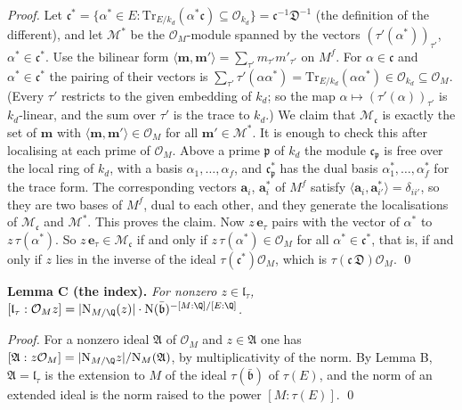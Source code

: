 \documentclass[11pt,letterpaper]{article}
\begin{document}
\emph{Proof.} Let
$\mathfrak c^{*}=\{\alpha^{*}\in E:\mathrm{Tr}_{E/k_d}(\alpha^{*}\mathfrak c)\subseteq\mathcal O_{k_d}\}
=\mathfrak c^{-1}\mathfrak D^{-1}$ (the definition of the different), and let $\mathcal M^{*}$ be the
$\mathcal O_M$-module spanned by the vectors $(\tau'(\alpha^{*}))_{\tau'}$,
$\alpha^{*}\in\mathfrak c^{*}$. Use the bilinear form
$\langle\mathbf m,\mathbf m'\rangle=\sum_{\tau'}m_{\tau'}m'_{\tau'}$ on $M^f$. For $\alpha\in\mathfrak c$
and $\alpha^{*}\in\mathfrak c^{*}$ the pairing of their vectors is
$\sum_{\tau'}\tau'(\alpha\alpha^{*})=\mathrm{Tr}_{E/k_d}(\alpha\alpha^{*})\in\mathcal O_{k_d}\subseteq\mathcal O_M$.
(Every $\tau'$ restricts to the given embedding of $k_d$; so the map
$\alpha\mapsto(\tau'(\alpha))_{\tau'}$ is $k_d$-linear, and the sum over $\tau'$ is the trace to $k_d$.)
We claim that $\mathcal M_{\mathfrak c}$ is exactly the set of $\mathbf m$ with
$\langle\mathbf m,\mathbf m'\rangle\in\mathcal O_M$ for all $\mathbf m'\in\mathcal M^{*}$. It is enough
to check this after localising at each prime of $\mathcal O_M$. Above a prime $\mathfrak p$ of $k_d$ the
module $\mathfrak c_{\mathfrak p}$ is free over the local ring of $k_d$, with a basis
$\alpha_1,\dots,\alpha_f$, and $\mathfrak c^{*}_{\mathfrak p}$ has the dual basis
$\alpha_1^{*},\dots,\alpha_f^{*}$ for the trace form. The corresponding vectors $\mathbf a_i$,
$\mathbf a_i^{*}$ of $M^f$ satisfy $\langle\mathbf a_i,\mathbf a_{i'}^{*}\rangle=\delta_{ii'}$, so they
are two bases of $M^f$, dual to each other, and they generate the localisations of
$\mathcal M_{\mathfrak c}$ and $\mathcal M^{*}$. This proves the claim. Now $z\,\mathbf e_\tau$ pairs with
the vector of $\alpha^{*}$ to $z\,\tau(\alpha^{*})$. So $z\,\mathbf e_\tau\in\mathcal M_{\mathfrak c}$ if
and only if $z\,\tau(\alpha^{*})\in\mathcal O_M$ for all $\alpha^{*}\in\mathfrak c^{*}$, that is, if and
only if $z$ lies in the inverse of the ideal $\tau(\mathfrak c^{*})\mathcal O_M$, which is
$\tau(\mathfrak c\,\mathfrak D)\mathcal O_M$. \qed

\textbf{Lemma C (the index).} \emph{For nonzero $z\in\mathfrak l_\tau$,\quad
$[\mathfrak l_\tau:\mathcal O_Mz]=|\mathrm N_{M/\Q}(z)|\cdot\mathrm N(\bar{\mathfrak b})^{-[M:\Q]/[E:\Q]}$.}

\emph{Proof.} For a nonzero ideal $\mathfrak A$ of $\mathcal O_M$ and $z\in\mathfrak A$ one has
$[\mathfrak A:z\mathcal O_M]=|\mathrm N_{M/\Q}z|/\mathrm N_M(\mathfrak A)$, by multiplicativity of the
norm. By Lemma B, $\mathfrak A=\mathfrak l_\tau$ is the extension to $M$ of the ideal
$\tau(\bar{\mathfrak b})$ of $\tau(E)$, and the norm of an extended ideal is the norm raised to the power
$[M:\tau(E)]$. \qed
\end{document}
